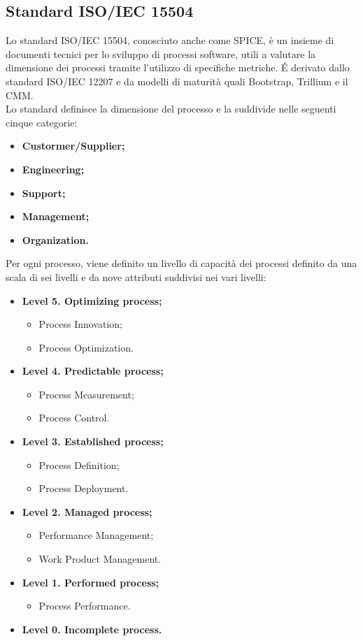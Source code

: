 	\subsection{Standard ISO/IEC 15504}
	Lo standard ISO/IEC 15504, conosciuto anche come SPICE, è un insieme di documenti tecnici per lo sviluppo di processi software, utili a valutare la dimensione dei processi tramite l'utilizzo di specifiche metriche. É derivato dallo standard ISO/IEC 12207 e da modelli di maturità quali Bootstrap, Trillium e il CMM.\\
	Lo standard definisce la dimensione del processo e la suddivide nelle seguenti cinque categorie:
		\begin{itemize}
			\item \textbf{Custormer/Supplier;}
			\item \textbf{Engineering;}
			\item \textbf{Support;}
			\item \textbf{Management;}
			\item \textbf{Organization.}
		\end{itemize}
	Per ogni processo, viene definito un livello di capacità dei processi definito da una scala di sei livelli e da nove attributi suddivisi nei vari livelli:
		\begin{itemize}
			\item \textbf{Level 5. Optimizing process;}
				\begin{itemize}
					\item Process Innovation;
					\item Process Optimization.
				\end{itemize}
			\item \textbf{Level 4. Predictable process;}
				\begin{itemize}
					\item Process Measurement;
					\item Process Control.
				\end{itemize}
			\item \textbf{Level 3. Established process;}
				\begin{itemize}
					\item Process Definition;
					\item Process Deployment.
				\end{itemize}
			\item \textbf{Level 2. Managed process;}
				\begin{itemize}
					\item Performance Management;
					\item Work Product Management.
				\end{itemize}			
			\item \textbf{Level 1. Performed process;}
				\begin{itemize}
					\item Process Performance.
				\end{itemize}
			\item \textbf{Level 0. Incomplete process.}
		\end{itemize}
